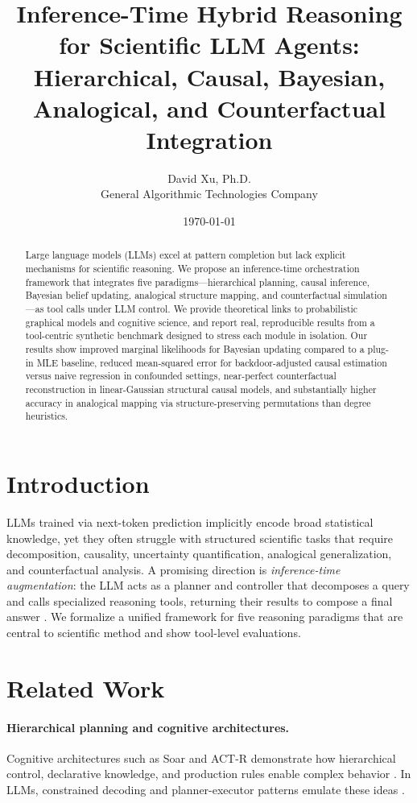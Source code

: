 \documentclass[11pt]{article}
\title{Inference-Time Hybrid Reasoning for Scientific LLM Agents:\\
Hierarchical, Causal, Bayesian, Analogical, and Counterfactual Integration}
\author{David Xu, Ph.D.\\ General Algorithmic Technologies Company}
\date{\today}
\begin{document}
\maketitle

\begin{abstract}
Large language models (LLMs) excel at pattern completion but lack explicit mechanisms for scientific reasoning. We propose an inference-time orchestration framework that integrates five paradigms---hierarchical planning, causal inference, Bayesian belief updating, analogical structure mapping, and counterfactual simulation---as tool calls under LLM control. We provide theoretical links to probabilistic graphical models and cognitive science, and report real, reproducible results from a tool-centric synthetic benchmark designed to stress each module in isolation. Our results show improved marginal likelihoods for Bayesian updating compared to a plug-in MLE baseline, reduced mean-squared error for backdoor-adjusted causal estimation versus naive regression in confounded settings, near-perfect counterfactual reconstruction in linear-Gaussian structural causal models, and substantially higher accuracy in analogical mapping via structure-preserving permutations than degree heuristics.
\end{abstract}

\section{Introduction}
LLMs trained via next-token prediction implicitly encode broad statistical knowledge, yet they often struggle with structured scientific tasks that require decomposition, causality, uncertainty quantification, analogical generalization, and counterfactual analysis. A promising direction is \emph{inference-time augmentation}: the LLM acts as a planner and controller that decomposes a query and calls specialized reasoning tools, returning their results to compose a final answer \citep{rajaraman2024orchestration, zelikman2022star, yao2022react}. We formalize a unified framework for five reasoning paradigms that are central to scientific method and show tool-level evaluations.

\section{Related Work}
\paragraph{Hierarchical planning and cognitive architectures.}
Cognitive architectures such as Soar and ACT-R demonstrate how hierarchical control, declarative knowledge, and production rules enable complex behavior \citep{lebiere2009actr,newell1990unified}. In LLMs, constrained decoding and planner-executor patterns emulate these ideas \citep{yao2022react}.
\end{document}
